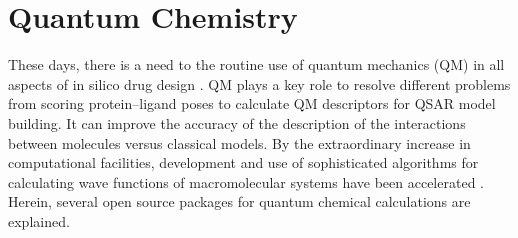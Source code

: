 \section{Quantum Chemistry}
  These days, there is a need to the routine use of quantum mechanics (QM) in all aspects of in silico drug design \cite{Vivo_2011}. QM plays a key role to resolve different problems from scoring protein–ligand poses to calculate QM descriptors for QSAR model building. It can improve the accuracy of the description of the interactions between molecules versus classical models. By the extraordinary increase in computational facilities, development and use of sophisticated algorithms for calculating wave functions of macromolecular systems have been accelerated \cite{Merz_2010}. Herein, several open source packages for quantum chemical calculations are explained.	 